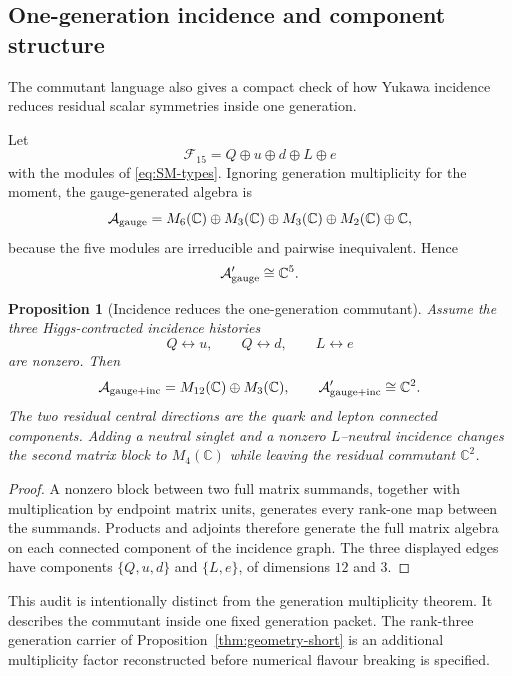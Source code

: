 \documentclass[11pt]{article}
\numberwithin{equation}{section}
\newtheorem{proposition}[theorem]{Proposition}
\theoremstyle{definition}
\theoremstyle{remark}
\newcommand{\C}{\mathbb C}
\newcommand{\A}{\mathcal A}
\begin{document}
\subsection{One-generation incidence and component structure}
\label{app:one-generation}

The commutant language also gives a compact check of how Yukawa incidence
reduces residual scalar symmetries inside one generation.

Let
\[
\mathcal F_{15}=Q\oplus u\oplus d\oplus L\oplus e
\]
with the modules of \eqref{eq:SM-types}.  Ignoring generation multiplicity for
the moment, the gauge-generated algebra is
\begin{equation}
\A_{\rm gauge}
=
M_6(\C)\oplus M_3(\C)\oplus M_3(\C)\oplus M_2(\C)\oplus\C,
\label{eq:one-gen-gauge-algebra}
\end{equation}
because the five modules are irreducible and pairwise inequivalent.  Hence
\[
\A_{\rm gauge}'\cong\C^5.
\]

\begin{proposition}[Incidence reduces the one-generation commutant]
\label{prop:one-gen-incidence}
Assume the three Higgs-contracted incidence histories
\[
Q\leftrightarrow u,\qquad
Q\leftrightarrow d,\qquad
L\leftrightarrow e
\]
are nonzero.  Then
\[
\A_{\rm gauge+inc}
=
M_{12}(\C)\oplus M_3(\C),
\qquad
\A_{\rm gauge+inc}'\cong\C^2.
\]
The two residual central directions are the quark and lepton connected
components.  Adding a neutral singlet and a nonzero $L$--neutral incidence
changes the second matrix block to $M_4(\C)$ while leaving the residual
commutant $\C^2$.
\end{proposition}

\begin{proof}
A nonzero block between two full matrix summands, together with multiplication
by endpoint matrix units, generates every rank-one map between the summands.
Products and adjoints therefore generate the full matrix algebra on each
connected component of the incidence graph.  The three displayed edges have
components $\{Q,u,d\}$ and $\{L,e\}$, of dimensions $12$ and $3$.
\end{proof}

This audit is intentionally distinct from the generation multiplicity theorem.
It describes the commutant inside one fixed generation packet.  The
rank-three generation carrier of Proposition~\ref{thm:geometry-short}
is an additional multiplicity factor reconstructed before numerical flavour
breaking is specified.
\end{document}

